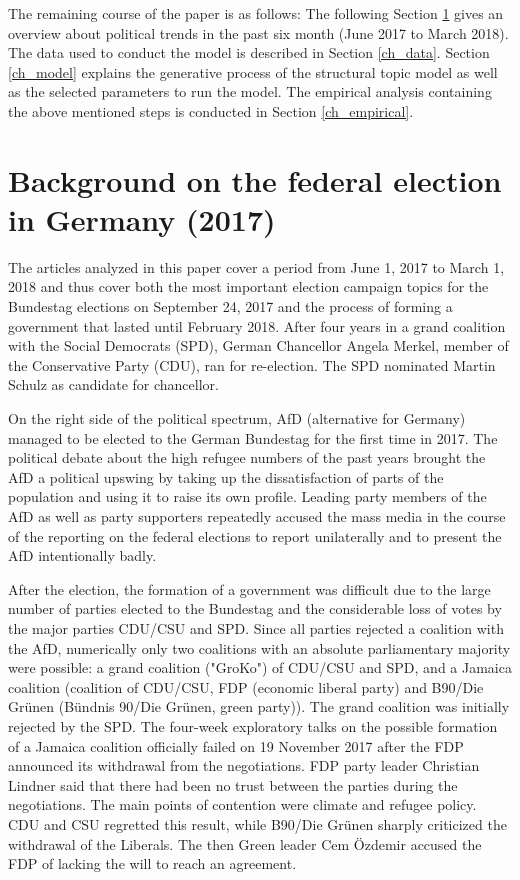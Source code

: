 \documentclass[12pt,a4paper,notitlepage]{article}
\begin{document}
The remaining course of the paper is as follows: The following Section \ref{ch_elections} gives an overview about political trends in the past six month (June 2017 to March 2018). The data used to conduct the model is described in Section \ref{ch_data}. Section \ref{ch_model} explains the generative process of the structural topic model as well as the selected parameters to run the model. The empirical analysis containing the above mentioned steps is conducted in Section \ref{ch_empirical}. 
 
\section{Background on the federal election in Germany (2017)}\label{ch_elections}

The articles analyzed in this paper cover a period from June 1, 2017 to March 1, 2018 and thus cover both the most important election campaign topics for the Bundestag elections on September 24, 2017 and the process of forming a government that lasted until February 2018. After four years in a grand coalition with the Social Democrats (SPD), German Chancellor Angela Merkel, member of the Conservative Party (CDU), ran for re-election. The SPD nominated Martin Schulz as candidate for chancellor. 

On the right side of the political spectrum, AfD (alternative for Germany) managed to be elected to the German Bundestag for the first time in 2017. The political debate about the high refugee numbers of the past years brought the AfD a political upswing by taking up the dissatisfaction of parts of the population and using it to raise its own profile. Leading party members of the AfD as well as party supporters repeatedly accused the mass media in the course of the reporting on the federal elections to report unilaterally and to present the AfD intentionally badly.

After the election, the formation of a government was difficult due to the large number of parties elected to the Bundestag and the considerable loss of votes by the major parties CDU/CSU and SPD. Since all parties rejected a coalition with the AfD, numerically only two coalitions with an absolute parliamentary majority were possible: a grand coalition ("GroKo") of CDU/CSU and SPD, and a Jamaica coalition (coalition of CDU/CSU, FDP (economic liberal party) and B90/Die Grünen (Bündnis 90/Die Grünen, green party)). The grand coalition was initially rejected by the SPD. The four-week exploratory talks on the possible formation of a Jamaica coalition officially failed on 19 November 2017 after the FDP announced its withdrawal from the negotiations. FDP party leader Christian Lindner said that there had been no trust between the parties during the negotiations. The main points of contention were climate and refugee policy. CDU and CSU regretted this result, while B90/Die Grünen sharply criticized the withdrawal of the Liberals. The then Green leader Cem Özdemir accused the FDP of lacking the will to reach an agreement.
\end{document}
